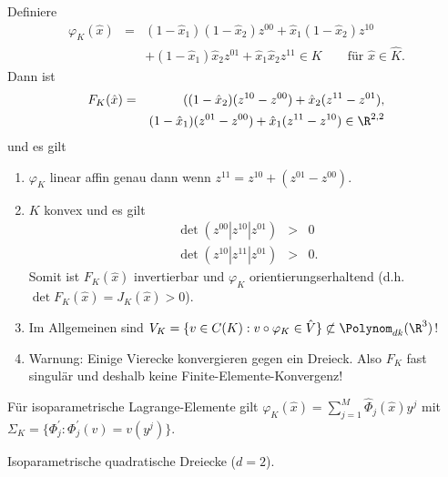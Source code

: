 \begin{Beispiel}
    Definiere
    \begin{eqnarray*}
            \varphi_K(\hat x)
        &=& (1 - \hat x_1)(1 - \hat x_2) z^{00} + \hat x_1 (1 - \hat x_2) z^{10}
            \\
            &&+ (1 - \hat x_1) \hat x_2 z^{01} + \hat x_1 \hat x_2 z^{11} \in K
            \qquad \text{für } \hat x \in \hat K.
    \end{eqnarray*}
    Dann ist
    \begin{eqnarray*}
            F_K(\hat x)
        &=& ((1 - \hat x_2)(z^{10} - z^{00}) + \hat x_2 (z^{11} - z^{01}), \\
            &&(1 - \hat x_1)(z^{01} - z^{00}) + \hat x_1 (z^{11} - z^{10})
        \in \R^{2,2}
    \end{eqnarray*}
    und es gilt
    \begin{enumerate}[1)]
        \item 
          $\varphi_K$ linear affin genau dann wenn
          $z^{11} = z^{10} + (z^{01} - z^{00})$.
        \item
          $K$ konvex und es gilt
          \begin{eqnarray*}
              \det (z^{00} | z^{10} | z^{01}) &>& 0 \\
              \det (z^{10} | z^{11} | z^{01}) &>& 0.
          \end{eqnarray*}
          Somit ist $F_K(\hat x)$ invertierbar und $\varphi_K$
          orientierungserhaltend (d.h. $\det F_K(\hat x) = J_K(\hat x) >0$).
        \item
          Im Allgemeinen sind
          $V_K = \{v\in C(K): v \circ \varphi_K\in \hat V\} \not\subset
          \Polynom_{dk}(\R^3)$!
        \item
          Warnung:
          Einige Vierecke konvergieren gegen ein Dreieck. Also $F_K$ fast
          singulär und deshalb keine Finite-Elemente-Konvergenz!
    \end{enumerate}
\end{Beispiel}


\begin{Lemma}
    \label{lem:4.8}
    Für isoparametrische Lagrange-Elemente gilt
    $\varphi_K(\hat x) = \sum_{j=1}^M \hat \Phi_j(\hat x) y^j$ mit
    $\Sigma_K = \{\Phi_j^\prime: \Phi_j^\prime(v) = v(y^j)\}$.
\end{Lemma}


\begin{Beispiel}
    Isoparametrische quadratische Dreiecke ($d = 2$).
\end{Beispiel}


